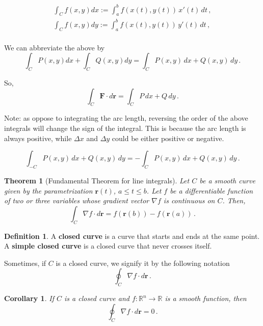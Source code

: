 \documentclass[
]{article}
\newtheorem{theorem}{Theorem}[section]
\newtheorem{corollary}{Corollary}[section]
\theoremstyle{definition}
\newtheorem{definition}{Definition}[section]
\theoremstyle{definition}
\theoremstyle{definition}
\theoremstyle{definition}
\theoremstyle{remark}
\begin{document}
\begin{align*}
\int_C f(x,y) dx := \int_a^b f(x(t), y(t) ) \, x'(t) \, dt \,, \\
\int_C f(x,y) dy := \int_a^b f(x(t), y(t) ) \, y'(t) \, dt \,, \\
\end{align*}

We can abbreviate the above by
\begin{equation*}
\int_C P(x,y) dx +
\int_C Q(x,y) dy 
= \int_C P(x,y) \, dx + Q(x,y) \, dy \,.
\end{equation*}

So,
\begin{equation*}
    \int_C \mathbf{F} \cdot d \mathbf{r} 
    = \int_C P \, dx + Q \, dy \,.
\end{equation*}

Note: as oppose to integrating the arc length, reversing the order of the above integrals
will change the sign of the integral.
This is because the arc length is always positive, while \(\Delta x\) and \(\Delta y\) could be either positive
or negative.

\begin{equation*}
\int_{-C} P(x,y) \, dx + Q(x,y) \, dy 
= -\int_C P(x,y) \, dx + Q(x,y) \, dy \,.
\end{equation*}

\begin{theorem}[Fundamental Theorem for line integrals]
Let \(C\) be a smooth curve given by the parametrization \(\mathbf{r}(t)\),
\(a \leq t \leq b\).
Let \(f\) be a differentiable function of two or three
variables whose gradient vector \(\nabla f\) is continuous on \(C\).
Then,
\begin{equation*}
    \int_C \nabla f \cdot d\mathbf{r} = f(\mathbf{r}(b)) - f(\mathbf{r}(a)) \,.
\end{equation*}
\end{theorem}

\begin{definition}
A \textbf{closed curve} is a curve that starts and ends at the same point.
A \textbf{simple closed curve} is a closed curve that never crosses itself.
\end{definition}

Sometimes, if \(C\) is a closed curve, we signify it by the following notation
\begin{equation*}
    \oint_C \nabla f \cdot d\mathbf{r} \,.
\end{equation*}

\begin{corollary}
If \(C\) is a closed curve and \(f:\mathbb{R}^n \to \mathbb{R}\) is a smooth function,
then
\begin{equation*}
    \oint_C \nabla f \cdot d\mathbf{r}  = 0 \,.
\end{equation*}
\end{corollary}
\end{document}
